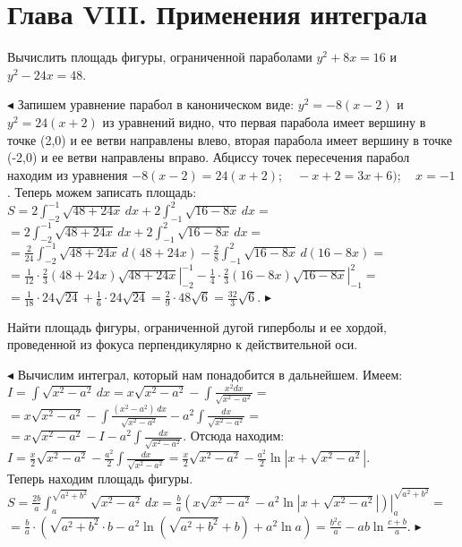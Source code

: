 \documentclass[a5paper,10pt]{article}
\begin{document}

\bigskip
\section* {Глава VIII. Применения интеграла}

\medskip
{} Вычислить площадь фигуры, ограниченной параболами
$y^2+8x=16$ и $y^2-24x=48$.

\medskip
\noindent $\blacktriangleleft$ Запишем уравнение парабол в каноническом виде:
$y^2=-8(x-2)$ и $y^2=24(x+2)$ из уравнений видно, что первая парабола
имеет вершину в точке (2,0) и ее ветви направлены влево, вторая парабола
имеет вершину в точке (-2,0) и ее ветви направлены вправо. Абциссу точек
пересечения парабол находим из уравнения $-8(x-2)=24(x+2);\quad -x+2=3x+6);\quad x=-1$.
Теперь можем записать площадь:\\
$\displaystyle S=2\int_{-2}^{-1}\sqrt{48+24x}\,dx+2\int_{-1}^{2}\sqrt{16-8x}\,dx=$\\
$\displaystyle =2\int_{-2}^{-1}\sqrt{48+24x}\,dx+2\int_{-1}^{2}\sqrt{16-8x}\,dx=$\\
$\displaystyle =\frac{2}{24}\int_{-2}^{-1}\sqrt{48+24x}\,d(48+24x)-
\frac{2}{8}\int_{-1}^{2}\sqrt{16-8x}\,d(16-8x)=$\\
$\displaystyle =\left.\frac{1}{12}\cdot\frac23(48+24x)\sqrt{48+24x}\right|_{-2}^{-1}-
\left.\frac{1}{4}\cdot\frac23(16-8x)\sqrt{16-8x}\right|_{-1}^{2}=$\\
$\displaystyle =\frac{1}{18}\cdot24\sqrt{24}+\frac{1}{6}\cdot24\sqrt{24}=
\frac29\cdot48\sqrt{6}=\frac{32}{3}\sqrt6$. $\blacktriangleright$

\medskip
{} Найти площадь фигуры, ограниченной дугой гиперболы
и ее хордой, проведенной из фокуса перпендикулярно к действительной оси.

\medskip
\noindent $\blacktriangleleft$ Вычислим интеграл, который нам понадобится
в дальнейшем. Имеем:\\
$\displaystyle I=\int\sqrt{x^2-a^2}\,dx=
x\sqrt{x^2-a^2}-\int\frac{x^2dx}{\sqrt{x^2-a^2}}=$\\
$\displaystyle =x\sqrt{x^2-a^2}-\int\frac{(x^2-a^2)\,dx}{\sqrt{x^2-a^2}}-a^2\int\frac{dx}{\sqrt{x^2-a^2}}=$\\
$\displaystyle =x\sqrt{x^2-a^2}-I-a^2\int\frac{dx}{\sqrt{x^2-a^2}}$. Отсюда находим:\\
$\displaystyle I=\frac x2\sqrt{x^2-a^2}-\frac{a^2}{2}\int\frac{dx}{\sqrt{x^2-a^2}}=
\frac x2\sqrt{x^2-a^2}-\frac{a^2}{2}\ln|x+\sqrt{x^2-a^2}|$.\\
Теперь находим площадь фигуры.\\
$\displaystyle S=\frac {2b}{a}\int_a^{\sqrt{a^2+b^2}}\sqrt{x^2-a^2}\,dx=
\frac{b}{a}\left.\left(x\sqrt{x^2-a^2}-a^2\ln|x+\sqrt{x^2-a^2}|\right )\right|_a^{\sqrt{a^2+b^2}}=$\\
$\displaystyle =\frac{b}{a}\cdot(\sqrt{a^2+b^2}\cdot b-a^2\ln(\sqrt{a^2+b^2}+b)+a^2\ln a)=
\frac{b^2c}{a}-ab\ln\frac{c+b}{a}$. $\blacktriangleright$
\end{document}
